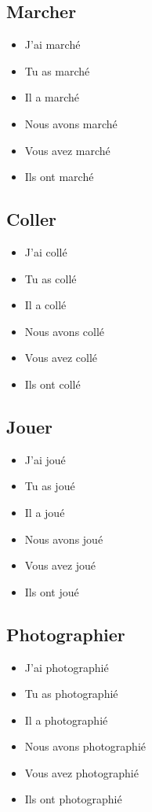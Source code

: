 \subsection{Marcher}

\begin{itemize}
    \item J'ai marché 
    \item Tu as marché 
    \item Il a marché
    \item Nous avons marché 
    \item Vous avez marché
    \item Ils ont marché
\end{itemize}

\subsection{Coller}

\begin{itemize}
    \item J'ai collé 
    \item Tu as collé 
    \item Il a collé 
    \item Nous avons collé 
    \item Vous avez collé 
    \item Ils ont collé
\end{itemize}

\subsection{Jouer}

\begin{itemize}
    \item J'ai joué
    \item Tu as joué 
    \item Il a joué 
    \item Nous avons joué 
    \item Vous avez joué 
    \item Ils ont joué
\end{itemize}

\subsection{Photographier}

\begin{itemize}
    \item J'ai photographié
    \item Tu as photographié
    \item Il a photographié
    \item Nous avons photographié
    \item Vous avez photographié
    \item Ils ont photographié
\end{itemize}

